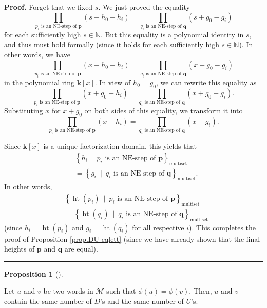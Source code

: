 \documentclass[numbers=enddot,12pt,final,onecolumn,notitlepage]{scrartcl}%
\theoremstyle{definition}
\newtheorem{prop}[theo]{Proposition}
\newenvironment{proposition}[1][]
{\begin{prop}[#1]\begin{leftbar}}
{\end{leftbar}\end{prop}}
\newenvironment{proof}[1][Proof]{\noindent\textbf{#1.} }{\ \rule{0.5em}{0.5em}}
\newcommand{\M}{\mathcal{M}}
\newcommand{\kk}{\mathbf{k}}
\newcommand{\NN}{\mathbb{N}}
\newcommand{\pp}{\mathbf{p}}
\newcommand{\qq}{\mathbf{q}}
\newcommand{\htt}{\operatorname{ht}}
\newcommand{\multiset}{\operatorname{multiset}}
\newenvironment{verlong}{}{}
\begin{document}
\begin{verlong}
\begin{proof}
Forget that we fixed $s$. We just proved the equality
\[
\prod_{p_{i}\text{ is an NE-step of }\pp}\left(  s+h_{0}-h_{i}\right)
=\prod_{q_{i}\text{ is an NE-step of }\qq}\left(  s+g_{0}-g_{i}\right)
\]
for each sufficiently high $s\in\NN$. But this equality is a polynomial
identity in $s$, and thus must hold formally (since it holds for each
sufficiently high $s\in\NN$). In other words, we have%
\[
\prod_{p_{i}\text{ is an NE-step of }\pp}\left(  x+h_{0}-h_{i}\right)
=\prod_{q_{i}\text{ is an NE-step of }\qq}\left(  x+g_{0}-g_{i}\right)
\]
in the polynomial ring $\kk\left[  x\right]  $. In view of $h_{0}%
=g_{0}$, we can rewrite this equality as%
\[
\prod_{p_{i}\text{ is an NE-step of }\pp}\left(  x+g_{0}-h_{i}\right)
=\prod_{q_{i}\text{ is an NE-step of }\qq}\left(  x+g_{0}-g_{i}\right)
.
\]
Substituting $x$ for $x+g_{0}$ on both sides of this equality, we transform it
into%
\[
\prod_{p_{i}\text{ is an NE-step of }\pp}\left(  x-h_{i}\right)
=\prod_{q_{i}\text{ is an NE-step of }\qq}\left(  x-g_{i}\right)  .
\]


Since $\kk\left[  x\right]  $ is a unique factorization domain, this
yields that%
\begin{align*}
&  \left\{  h_{i}\ \mid\ p_{i}\text{ is an NE-step of }\pp\right\}
_{\multiset}\\
&  =\left\{  g_{i}\ \mid\ q_{i}\text{ is an NE-step of }\qq\right\}
_{\multiset}.
\end{align*}
In other words,%
\begin{align*}
&  \left\{  \htt\left(  p_{i}\right)  \ \mid\ p_{i}\text{ is an
NE-step of }\pp\right\}  _{\multiset}\\
&  =\left\{  \htt\left(  q_{i}\right)  \ \mid\ q_{i}\text{ is an
NE-step of }\qq\right\}  _{\multiset}%
\end{align*}
(since $h_{i}=\htt\left(  p_{i}\right)  $ and $g_{i}%
=\htt\left(  q_{i}\right)  $ for all respective $i$). This
completes the proof of Proposition \ref{prop.DU-eqlett} (since we have already
shown that the final heights of $\pp$ and $\qq$ are equal).
\end{proof}
\end{verlong}

\begin{proposition}
\label{prop.DU-eqlett2}
Let $u$ and $v$ be two words in $\M$ such
that $\phi\left(  u\right)  =\phi\left(  v\right)  $. Then, $u$ and $v$
contain the same number of $D$'s and the same number of $U$'s.
\end{proposition}
\end{document}
